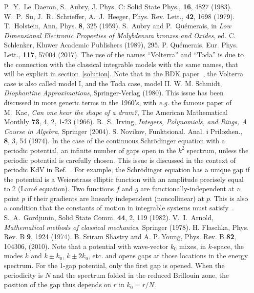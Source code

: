 \documentclass[]{revtex4-1}
\begin{document}
\begin{thebibliography}{99}
 P.~Y.~Le~Daeron, S.~Aubry, J. Phys. C: Solid State Phys., \textbf{16}, 4827 (1983).
 W.~P.~Su, J.~R.~Schrieffer, A.~J.~Heeger, Phys. Rev. Lett., \textbf{42}, 1698 (1979).
 T.~Holstein, Ann. Phys. \textbf{8}, 325 (1959).
 S.~Aubry and P.~Qu\'emerais,
  in \textit{Low Dimensional Electronic Properties of Molybdenum bronzes and Oxides}, ed. C. Schlenker, Kluwer Academic Publishers (1989), 295.
 P. Qu\'emerais, Eur. Phys. Lett., \textbf{117}, 57004 (2017).
 The use of the names ``Volterra'' and ``Toda'' is due to the connection with the classical integrable models with the same names, that will be explicit in section~\ref{solution}. Note that in the BDK paper~\cite{BDK}, the Volterra case is also called model I, and the Toda case, model II. 
 W. M. Schmidt, \textit{Diophantine Approximations}, Springer-Verlag (1980).
 This issue has been discussed in more generic terms in the 1960's, with \textit{e.g.} the famous paper of M.~Kac, \textit{Can one hear the shape of a drum?}, The American Mathematical Monthly \textbf{73}, 4, 2, 1-23 (1966).
 R.~S.~Irving, \textit{Integers, Polynomials, and Rings, A Course in Algebra}, Springer (2004). 
 S. Novikov, Funktsional. Anal. i Prilozhen., \textbf{8}, 3, 54 (1974).
 In the case of the continuous Schr\"odinger equation with a periodic potential, an infinite number of gaps open in the $k^2$ spectrum, unless the periodic potential is carefully chosen. This issue is discussed in the context of periodic KdV in Ref.~\cite{Novikov}.  For example, the Schr\"odinger equation has a unique gap if the potential is a Weierstrass elliptic function with an amplitude precisely equal to 2 (Lam\'e equation).
  Two functions $f$ and $g$ are functionally-independent at a point $p$ if their gradients are linearly independent (noncollinear) at $p$.  This is also a condition that the constants of motion in integrable systems must satisfy~\cite{arnold}.
 S.~A.~Gordjunin, Solid State Comm. \textbf{44}, 2, 119 (1982).  
 V.~I.~Arnold, \textit{Mathematical methods of classical mechanics}, Springer (1978).
 H. Flaschka, Phys. Rev. B \textbf{9}, 1924 (1974).
 B. Sriram Shastry and A. P. Young, Phys. Rev. B \textbf{82}, 104306, (2010).
 Note that a potential with wave-vector $k_0$ mixes, in $k$-space, the modes $k$ and $k \pm k_0$, $k \pm 2k_0$, etc. and opens gaps at those locations in the energy spectrum. For the 1-gap potential, only the first gap is opened. When the periodicity is $N$ and the spectrum folded in the reduced Brillouin zone, the position of the gap thus depends on $r$ in $k_0=r/N$.

\end{thebibliography}
\end{document}

